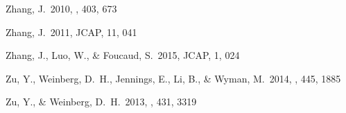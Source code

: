 \documentclass[apj]{emulateapj}
\begin{document}
\begin{thebibliography}{}
   Zhang, J.\ 2010, \mnras, 403,
 673

  Zhang, J.\ 2011, JCAP, 11, 041


  Zhang, J., Luo, W.,
  \& Foucaud, S.\ 2015, JCAP, 1, 024


 Zu, Y., Weinberg, D.~H.,
  Jennings, E., Li, B., \& Wyman, M.\ 2014, \mnras, 445, 1885

  Zu, Y.,
  \& Weinberg, D.~H.\ 2013, \mnras, 431, 3319


\end{thebibliography}
\end{document}
